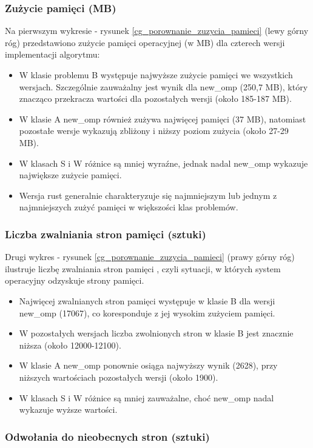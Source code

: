 \subsubsection{Zużycie pamięci (MB)}
Na pierwszym wykresie - rysunek \ref{cg_porownanie_zuzycia_pamieci} (lewy górny róg) przedstawiono zużycie pamięci operacyjnej (w MB) dla czterech wersji implementacji algorytmu:
\begin{itemize}
    \item W klasie problemu B występuje najwyższe zużycie pamięci we wszystkich wersjach. Szczególnie zauważalny jest wynik dla new\_omp (250,7 MB), który znacząco przekracza wartości dla pozostałych wersji (około 185-187 MB).
    \item W klasie A new\_omp również zużywa najwięcej pamięci (37 MB), natomiast pozostałe wersje wykazują zbliżony i niższy poziom zużycia (około 27-29 MB).
    \item W klasach S i W różnice są mniej wyraźne, jednak nadal new\_omp wykazuje największe zużycie pamięci.
    \item Wersja rust generalnie charakteryzuje się najmniejszym lub jednym z najmniejszych zużyć pamięci w większości klas problemów.
\end{itemize}

\subsubsection{Liczba zwalniania stron pamięci (sztuki)}
Drugi wykres - rysunek \ref{cg_porownanie_zuzycia_pamieci} (prawy górny róg) ilustruje liczbę zwalniania stron pamięci , czyli sytuacji, w których system operacyjny odzyskuje strony pamięci.
\begin{itemize}
    \item Najwięcej zwalnianych stron pamięci występuje w klasie B dla wersji new\_omp (17067), co koresponduje z jej wysokim zużyciem pamięci.
    \item W pozostałych wersjach liczba zwolnionych stron w klasie B jest znacznie niższa (około 12000-12100).
    \item W klasie A new\_omp ponownie osiąga najwyższy wynik (2628), przy niższych wartościach pozostałych wersji (około 1900).
    \item W klasach S i W różnice są mniej zauważalne, choć new\_omp nadal wykazuje wyższe wartości.
\end{itemize}

\subsubsection{Odwołania do nieobecnych stron (sztuki)}

